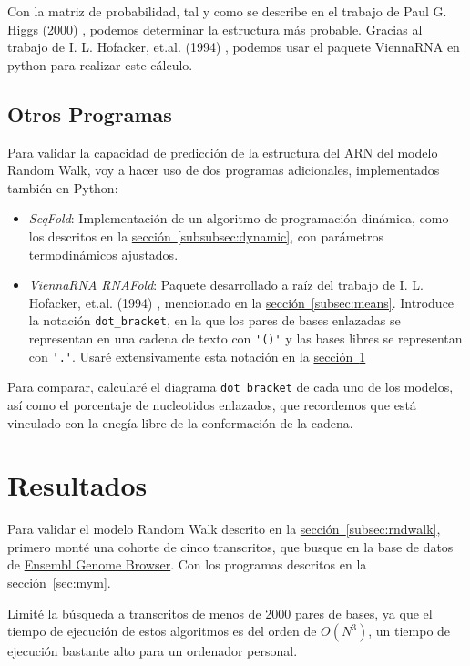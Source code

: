 \documentclass[a4paper,11pt,titlepage]{article}
\newcommand{\nr}[2][sección]{\hyperref[#2]{#1~\ref{#2}}}
\theoremstyle{definition}
\begin{document}
Con la matriz de probabilidad, tal y como se describe en el trabajo de Paul G. Higgs (2000) \cite{phiggs}, podemos determinar la estructura más probable. Gracias al trabajo de I. L. Hofacker, et.al. (1994) \cite{hofacker}, podemos usar el paquete ViennaRNA en python para realizar este cálculo.

\subsection{Otros Programas}\label{subsec:packages}

Para validar la capacidad de predicción de la estructura del ARN del modelo Random Walk, voy a hacer uso de dos programas adicionales, implementados también en Python:

\begin{itemize}
    \item \textit{SeqFold}\cite{seqfold}: Implementación de un algoritmo de programación dinámica, como los descritos en la \nr[sección]{subsubsec:dynamic}, con parámetros termodinámicos ajustados.
    \item \textit{ViennaRNA RNAFold}\cite{viennarna}: Paquete desarrollado a raíz del trabajo de  I. L. Hofacker, et.al. (1994) \cite{hofacker}, mencionado en la \nr[sección]{subsec:means}. Introduce la notación \verb|dot_bracket|, en la que los pares de bases enlazadas se representan en una cadena de texto con \verb|'()'| y las bases libres se representan con \verb|'.'|. Usaré extensivamente esta notación en la \nr[sección]{sec:res}
\end{itemize}

Para comparar, calcularé el diagrama \verb|dot_bracket| de cada uno de los modelos, así como el porcentaje de nucleotidos enlazados, que recordemos que está vinculado con la enegía libre de la conformación de la cadena.


\section{Resultados}\label{sec:res}

Para validar el modelo Random Walk descrito en la \nr[sección]{subsec:rndwalk}, primero monté una cohorte de cinco transcritos, que busque en la base de datos de \href{https://www.ensembl.org/index.html}{Ensembl Genome Browser}. Con los programas descritos en la \nr[sección]{sec:mym}. 

Limité la búsqueda a transcritos de menos de 2000 pares de bases, ya que el tiempo de ejecución de estos algoritmos es del orden de $O(N^3)$, un tiempo de ejecución bastante alto para un ordenador personal.
\end{document}
